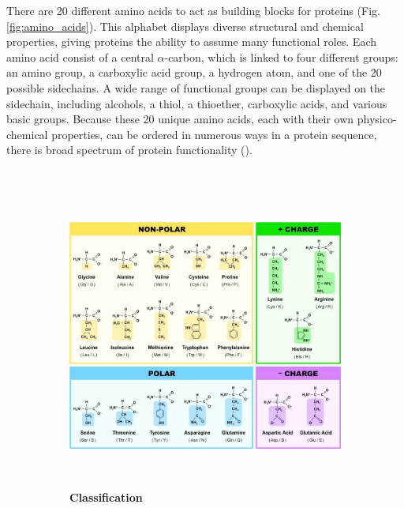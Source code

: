 There are 20 different amino acids to act as building blocks for proteins (Fig. \ref{fig:amino_acids}).
This alphabet displays diverse structural and chemical properties, 
giving proteins the ability to assume many functional roles.
Each amino acid consist of a central $\alpha$-carbon,
which is linked to four different groups:
an amino group,
a carboxylic acid group,
a hydrogen atom,
and one of the 20 possible sidechains.
A wide range of functional groups can be displayed on the sidechain,
including alcohols,
a thiol,
a thioether,
carboxylic acids,
and various basic groups.
Because these 20 unique amino acids,
each with their own physico-chemical properties,
can be ordered in numerous ways in a protein sequence, 
there is broad spectrum of protein functionality
(\cite{berg2015}).

~\begin{figure}[h!]
	~\begin{subfigure}[b]{0.70\linewidth}
		\includegraphics[width=\linewidth]{./literature_review/proteins/amino_acids/img/classification.jpg}
		\caption{\textbf{Classification}}
	~\end{subfigure}
	~\begin{subfigure}[b]{0.25\linewidth}

\end{subfigure}
\end{figure}
